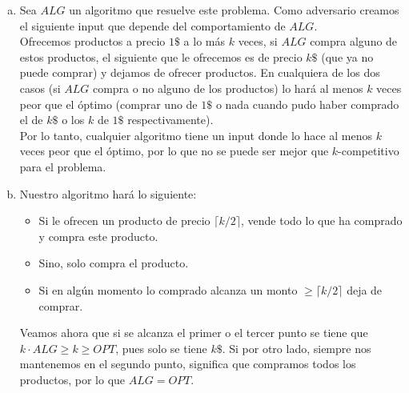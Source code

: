 \documentclass[dcc,uchile]{fcfmcourse}
\theoremstyle{plain}
\theoremstyle{definition}
\begin{document}
\begin{problems}
\begin{enumerate}[a)]
\end{enumerate}
\item 
\begin{enumerate}[a)]
    \item Sea $ALG$ un algoritmo que resuelve este problema. Como adversario creamos el siguiente input que depende del comportamiento de $ALG$.\\
    Ofrecemos productos a precio $1\$$ a lo más $k$ veces, si $ALG$ compra alguno de estos productos, el siguiente que le ofrecemos es de precio $k\$$ (que ya no puede comprar) y dejamos de ofrecer productos. En cualquiera de los dos casos (si $ALG$ compra o no alguno de los productos) lo hará al menos $k$ veces peor que el óptimo (comprar uno de $1\$$ o nada cuando pudo haber comprado el de $k\$$ o los $k$ de $1\$$ respectivamente).\\ Por lo tanto, cualquier algoritmo tiene un input donde lo hace al menos $k$ veces peor que el óptimo, por lo que no se puede ser mejor que $k$-competitivo para el problema.
    
    \item Nuestro algoritmo hará lo siguiente:
    \begin{itemize}
        \item Si le ofrecen un producto de precio $\lceil k/2 \rceil$, vende todo lo que ha comprado y compra este producto.
        \item Sino, solo compra el producto.
        \item Si en algún momento lo comprado alcanza un monto $\ge \lceil k/2 \rceil$ deja de comprar.
    \end{itemize}
    Veamos ahora que si se alcanza el primer o el tercer punto se tiene que $ k\cdot ALG \ge k \ge OPT$, pues solo se tiene $k\$$. Si por otro lado, siempre nos mantenemos en el segundo punto, significa que compramos  todos los productos, por lo que $ALG = OPT$.
\end{enumerate}
\end{problems}
\end{document}
